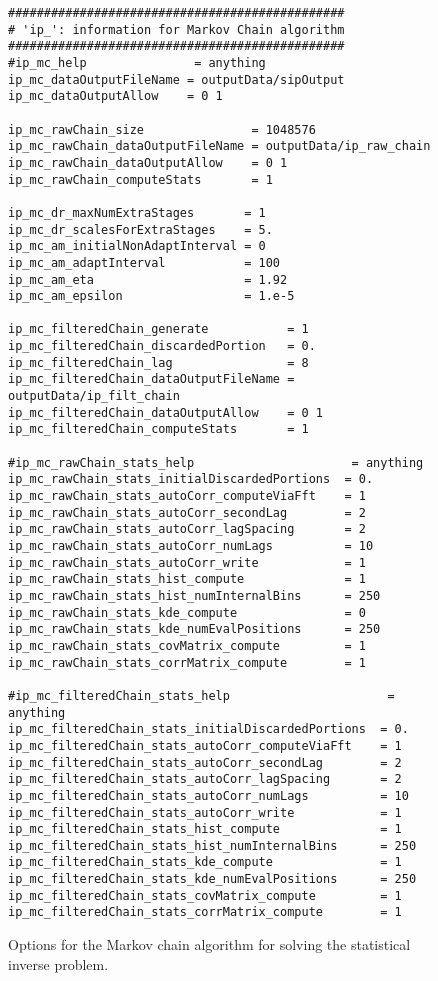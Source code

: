 \begin{figure}[h!]
\begin{center}
\begin{verbatim}
###############################################
# 'ip_': information for Markov Chain algorithm
###############################################
#ip_mc_help               = anything
ip_mc_dataOutputFileName = outputData/sipOutput
ip_mc_dataOutputAllow    = 0 1

ip_mc_rawChain_size               = 1048576
ip_mc_rawChain_dataOutputFileName = outputData/ip_raw_chain
ip_mc_rawChain_dataOutputAllow    = 0 1
ip_mc_rawChain_computeStats       = 1

ip_mc_dr_maxNumExtraStages       = 1
ip_mc_dr_scalesForExtraStages    = 5.
ip_mc_am_initialNonAdaptInterval = 0
ip_mc_am_adaptInterval           = 100
ip_mc_am_eta                     = 1.92
ip_mc_am_epsilon                 = 1.e-5

ip_mc_filteredChain_generate           = 1
ip_mc_filteredChain_discardedPortion   = 0.
ip_mc_filteredChain_lag                = 8
ip_mc_filteredChain_dataOutputFileName = outputData/ip_filt_chain
ip_mc_filteredChain_dataOutputAllow    = 0 1
ip_mc_filteredChain_computeStats       = 1

#ip_mc_rawChain_stats_help                      = anything
ip_mc_rawChain_stats_initialDiscardedPortions  = 0.
ip_mc_rawChain_stats_autoCorr_computeViaFft    = 1
ip_mc_rawChain_stats_autoCorr_secondLag        = 2
ip_mc_rawChain_stats_autoCorr_lagSpacing       = 2
ip_mc_rawChain_stats_autoCorr_numLags          = 10
ip_mc_rawChain_stats_autoCorr_write            = 1
ip_mc_rawChain_stats_hist_compute              = 1
ip_mc_rawChain_stats_hist_numInternalBins      = 250
ip_mc_rawChain_stats_kde_compute               = 0
ip_mc_rawChain_stats_kde_numEvalPositions      = 250
ip_mc_rawChain_stats_covMatrix_compute         = 1
ip_mc_rawChain_stats_corrMatrix_compute        = 1

#ip_mc_filteredChain_stats_help                      = anything
ip_mc_filteredChain_stats_initialDiscardedPortions  = 0.
ip_mc_filteredChain_stats_autoCorr_computeViaFft    = 1
ip_mc_filteredChain_stats_autoCorr_secondLag        = 2
ip_mc_filteredChain_stats_autoCorr_lagSpacing       = 2
ip_mc_filteredChain_stats_autoCorr_numLags          = 10
ip_mc_filteredChain_stats_autoCorr_write            = 1
ip_mc_filteredChain_stats_hist_compute              = 1
ip_mc_filteredChain_stats_hist_numInternalBins      = 250
ip_mc_filteredChain_stats_kde_compute               = 1
ip_mc_filteredChain_stats_kde_numEvalPositions      = 250
ip_mc_filteredChain_stats_covMatrix_compute         = 1
ip_mc_filteredChain_stats_corrMatrix_compute        = 1
\end{verbatim}
\end{center}
\caption{
Options for the Markov chain algorithm for solving the statistical inverse problem.
}
\label{fig-options-input-2}
\end{figure}

